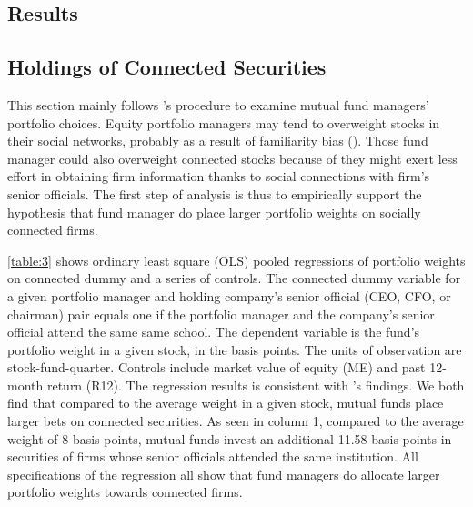 \documentclass[11pt]{article}
\begin{document}
\begin{doublespace}
\section{Results}
\subsection{Holdings of Connected Securities}
This section mainly follows \cite{cohen2008small} 's procedure to examine mutual fund managers' portfolio choices. Equity portfolio managers may tend to overweight stocks in their social networks, probably as a result of familiarity bias (\cite{huberman2001familiarity}). Those fund manager could also overweight connected stocks because of they might exert less effort in obtaining firm information thanks to social connections with firm's senior officials. The first step of analysis is thus to empirically support the hypothesis that fund manager do place larger portfolio weights on socially connected firms. 

\ref{table:3} shows ordinary least square (OLS) pooled regressions of portfolio weights on connected dummy and a series of controls. The connected dummy variable for a given portfolio manager and holding company's senior official (CEO, CFO, or chairman) pair equals one if the portfolio manager and the company's senior official attend the same same school. The dependent variable is the fund's portfolio weight in a given stock, in the basis points. The units of observation are stock-fund-quarter. Controls include market value of equity (ME) and past 12-month return (R12). The regression results is consistent with \cite{cohen2008small} 's findings. We both find that compared to the average weight in a given stock, mutual funds place larger bets on connected securities. As seen in column 1, compared to the average weight of 8 basis points, mutual funds invest an additional 11.58 basis points in securities of firms whose senior officials attended the same institution. All specifications of the regression all show that fund managers do allocate larger portfolio weights towards connected firms.


\end{doublespace}
\end{document}
